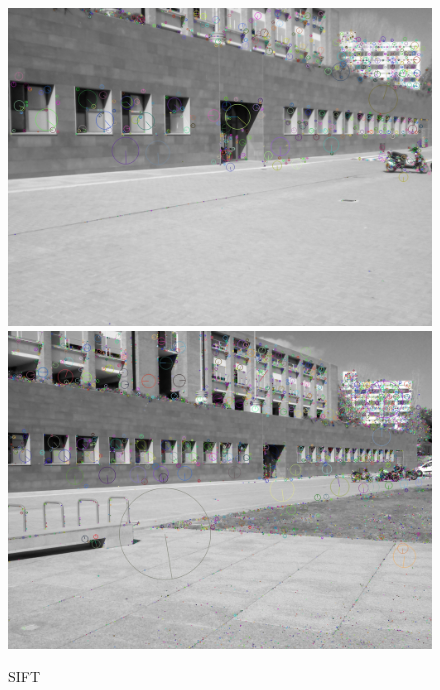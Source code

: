 		\begin{figure}[!htb]
				\includegraphics[width=\linewidth]{images/experiments/KP_SIFT_2}
				\label{fig:awesome_image1}
			\endminipage\hfill
				\includegraphics[width=\linewidth]{images/experiments/KP_SIFT_3}
				\label{fig:awesome_image2}
			\endminipage
			\caption{SIFT}
		\end{figure}
